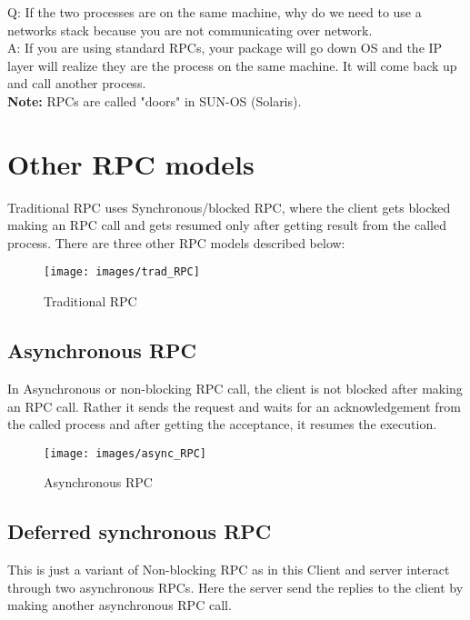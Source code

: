 \documentclass[twoside]{article}
\begin{document}
Q: If the two processes are on the same machine, why do we need to use a networks stack because you are not communicating over network.\\
A: If you are using standard RPCs, your package will go down OS and the IP layer will realize they are the process on the same machine. It will come back up and call another process.\\

\textbf{Note:} RPCs are called "doors" in SUN-OS (Solaris).

\section{Other RPC models}

Traditional RPC uses Synchronous/blocked RPC, where the client gets blocked making an RPC call and gets resumed only after getting result from the called process. There are three other RPC models described below:

\begin{figure}[h]
\begin{center}
\texttt{[image: images/trad\_RPC]}
\caption{Traditional RPC}
\end{center}
\end{figure}

\subsection{Asynchronous RPC}

In Asynchronous or non-blocking RPC call, the client is not blocked after making an RPC call. Rather it sends the request and waits for an acknowledgement from the called process and after getting the acceptance, it resumes the execution.

\begin{figure}[h]
\begin{center}
\texttt{[image: images/async\_RPC]}
\caption{Asynchronous RPC}
\end{center}
\end{figure}

\subsection{Deferred synchronous RPC}

This is just a variant of Non-blocking RPC as in this Client and server interact through two asynchronous RPCs. Here the server send the replies to the client by making another asynchronous RPC call.
\end{document}
